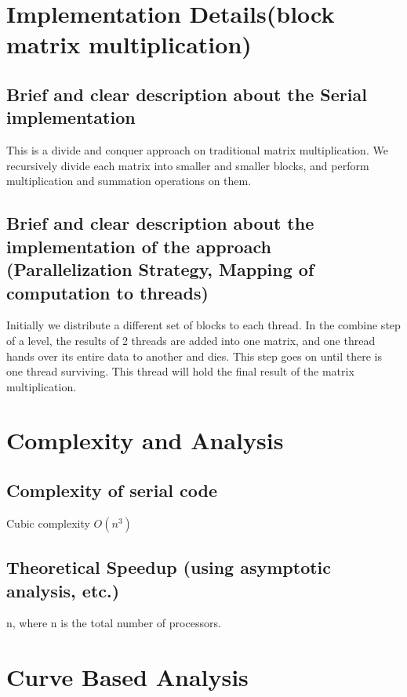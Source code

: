 \documentclass[runningheads, a4paper, oribibl]{llncs}
\begin{document}
\section{Implementation Details(block matrix multiplication)}
\subsection{Brief and clear description about the Serial implementation}
This is a divide and conquer approach on traditional matrix multiplication. We recursively divide each matrix into smaller and smaller blocks, and perform multiplication and summation operations on them.
\subsection{Brief and clear description about the implementation of the approach (Parallelization Strategy, Mapping of computation to threads)}
Initially we distribute a different set of blocks to each thread. In the combine step of a level, the results of 2 threads are added into one matrix, and one thread hands over its entire data to another and dies. This step goes on until there is one thread surviving. This thread will hold the final result of the matrix multiplication.
\section{Complexity and Analysis}
\subsection{Complexity of serial code}
Cubic complexity $O(n^3)$
\subsection{Theoretical Speedup (using asymptotic analysis, etc.)}
n, where n is the total number of processors.
\section{Curve Based Analysis}
\end{document}

